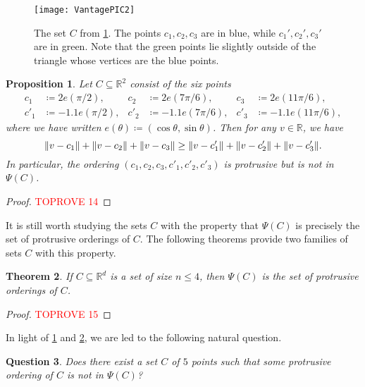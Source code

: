 \documentclass[11pt]{amsart}
\newtheorem{theorem}{Theorem}[section]
\newtheorem{proposition}[theorem]{Proposition}
\newtheorem{question}[theorem]{Question}
\theoremstyle{definition}
\DeclarePairedDelimiter{\Abs}{\lVert}{\rVert}
\newcommand{\RR}{\mathbb{R}}
\begin{document}
\begin{figure}[tbp]
\begin{center}{\texttt{[image: VantagePIC2]}}
\end{center}
\caption{The set $C$ from \cref{prop:6-points}. The points $c_1,c_2,c_3$ are in blue, while $c_1',c_2',c_3'$ are in green. Note that the green points lie slightly outside of the triangle whose vertices are the blue points. }
\label{fig:6points}
\end{figure}

\begin{proposition}\label{prop:6-points}
Let $C \subseteq \RR^2$ consist of the six points
\begin{align*}
c_1&\coloneqq2e(\pi/2), &c_2&\coloneqq2e(7\pi/6),&c_3&\coloneqq2e(11\pi/6),\\
c'_1&\coloneqq-1.1e(\pi/2), &c'_2&\coloneqq-1.1e(7\pi/6), &c'_3&\coloneqq-1.1e(11\pi/6),
\end{align*}
where we have written $e(\theta)\coloneqq(\cos \theta, \sin \theta)$.
Then for any $v \in \RR$, we have
\[\Abs{v-c_1}+\Abs{v-c_2}+\Abs{v-c_3} \geq \Abs{v-c'_1}+\Abs{v-c'_2}+\Abs{v-c'_3}.\]
In particular, the ordering $(c_1, c_2, c_3, c'_1, c'_2, c'_3)$ is protrusive but is not in $\Psi(C)$.
\end{proposition}

\begin{proof}\textcolor{red}{TOPROVE 14}\end{proof}

It is still worth studying the sets $C$ with the property that $\Psi(C)$ is precisely the set of protrusive orderings of $C$. The following theorems provide two families of sets $C$ with this property. 

\begin{theorem}\label{thm:4-points}
If $C\subseteq\RR^d$ is a set of size $n\leq 4$, then $\Psi(C)$ is the set of protrusive orderings of $C$.
\end{theorem} 

\begin{proof}\textcolor{red}{TOPROVE 15}\end{proof}

In light of \cref{prop:6-points} and \cref{thm:4-points}, we are led to the following natural question. 

\begin{question}
Does there exist a set $C$ of $5$ points such that some protrusive ordering of $C$ is not in $\Psi(C)$?
\end{question}
\end{document}
